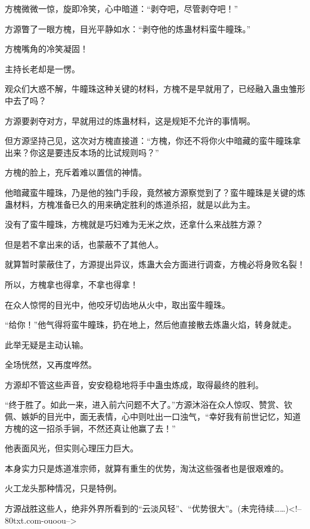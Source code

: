 \begin{this_body}
方槐微微一惊，旋即冷笑，心中暗道：“剥夺吧，尽管剥夺吧！”

方源瞥了一眼方槐，目光平静如水：“剥夺他的炼蛊材料蛮牛瞳珠。”

方槐嘴角的冷笑凝固！

主持长老却是一愣。

观众们大惑不解，牛瞳珠这种关键的材料，方槐不是早就用了，已经融入蛊虫雏形中去了吗？

方源要剥夺对方，早就用过的炼蛊材料，这是规矩不允许的事情啊。

但方源坚持己见，这次对方槐直接道：“方槐，你还不将你火中暗藏的蛮牛瞳珠拿出来？你这是要违反本场的比试规则吗？”

方槐的脸上，充斥着难以置信的神情。

他暗藏蛮牛瞳珠，乃是他的独门手段，竟然被方源察觉到了？蛮牛瞳珠是关键的炼蛊材料，方槐准备已久的用来确定胜利的炼道杀招，就是以此为主。

没有了蛮牛瞳珠，方槐就是巧妇难为无米之炊，还拿什么来战胜方源？

但是若不拿出来的话，也蒙蔽不了其他人。

就算暂时蒙蔽住了，方源提出异议，炼蛊大会方面进行调查，方槐必将身败名裂！

所以，方槐拿也得拿，不拿也得拿！

在众人惊愕的目光中，他咬牙切齿地从火中，取出蛮牛瞳珠。

“给你！”他气得将蛮牛瞳珠，扔在地上，然后他直接散去炼蛊火焰，转身就走。

此举无疑是主动认输。

全场恍然，又再度哗然。

方源却不管这些声音，安安稳稳地将手中蛊虫炼成，取得最终的胜利。

“终于胜了。如此一来，进入前六问题不大了。”方源沐浴在众人惊叹、赞赏、钦佩、嫉妒的目光中，面无表情，心中则吐出一口浊气，“幸好我有前世记忆，知道方槐的这一招杀手锏，不然还真让他赢了去！”

他表面风光，但实则心理压力巨大。

本身实力只是炼道准宗师，就算有重生的优势，淘汰这些强者也是很艰难的。

火工龙头那种情况，只是特例。

方源战胜这些人，绝非外界所看到的“云淡风轻”、“优势很大”。(未完待续……)<!--80txt.com-ouoou-->

\end{this_body}

